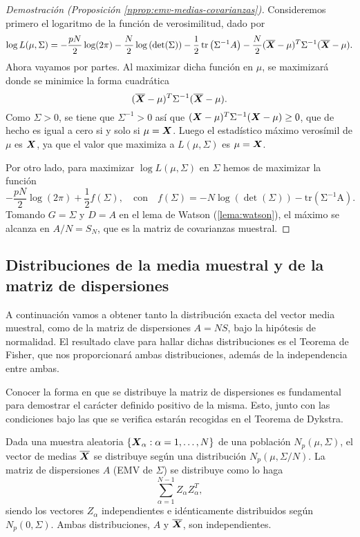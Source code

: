 \begin{proof}[Demostración (Proposición \ref{nprop:emv-medias-covarianzas})]
  Consideremos primero el logaritmo de la función de verosimilitud, dado por
  \[
    \log L(\mu,\Sigma) = -\frac{pN}{2}\log(2\pi) - \frac{N}{2}\log\left(\det(\Sigma)\right) - \frac{1}{2}\operatorname{tr}\left(\Sigma^{-1}A\right) - \frac{N}{2}(\overline{\boldsymbol{X}} - \mu)^T \Sigma^{-1}(\overline{\boldsymbol{X}} - \mu).
  \]
  Ahora vayamos por partes. Al maximizar dicha función en \(\mu\), se maximizará donde se minimice la forma cuadrática
  \[
    (\overline{\boldsymbol{X}} - \mu)^T \Sigma^{-1}(\overline{\boldsymbol{X}} - \mu).
  \]
  Como $\Sigma > 0$, se tiene que $\Sigma^{-1} > 0$ así que $(\boldsymbol{X} - \mu)^T \Sigma^{-1}(\boldsymbol{X} - \mu) \geq 0$, que de hecho es igual a cero si y solo si $\mu = \boldsymbol{X}$. 
  Luego el estadístico máximo verosímil de $\mu$ es $\boldsymbol{X}$, ya que el valor que maximiza a $L(\mu,\Sigma)$ es $\mu = \boldsymbol{X}$.

  Por otro lado, para maximizar $\log L(\mu,\Sigma)$ en $\Sigma$ hemos de maximizar la función
  \[
    -\frac{pN}{2}\log(2\pi) + \frac{1}{2}f(\Sigma), \quad \text{con} \quad f(\Sigma) = -N\log(\operatorname{det}(\Sigma)) - \operatorname{tr(\Sigma^{-1}A)}.
  \]
  Tomando \(G = \Sigma\) y \(D = A\) en el lema de Watson (\ref{lema:watson}), el máximo se alcanza en \(A/N = S_N\), que es la matriz de covarianzas muestral.
\end{proof}

\subsection{Distribuciones de la media muestral y de la matriz de dispersiones}

A continuación vamos a obtener tanto la distribución exacta del vector media muestral, como de la matriz de dispersiones \(A = NS\), bajo la hipótesis de normalidad.
El resultado clave para hallar dichas distribuciones es el Teorema de Fisher, que nos proporcionará ambas distribuciones, además de la independencia entre ambas. 

Conocer la forma en que se distribuye la matriz de dispersiones es fundamental para demostrar el carácter definido positivo de la misma. 
Esto, junto con las condiciones bajo las que se verifica estarán recogidas en el Teorema de Dykstra.

\begin{nth}
  Dada una muestra aleatoria $\{\boldsymbol{X}_\alpha: \alpha = 1,\dots,N\}$ de una población $N_p(\mu,\Sigma)$, el vector de medias $\overline{\boldsymbol{X}}$ se distribuye según una distribución $N_p\left(\mu,\Sigma/N\right)$.
  La matriz de dispersiones $A$ (EMV de $\Sigma$) se distribuye como lo haga
  \[
    \sum_{\alpha =1}^{N-1} Z_\alpha Z_\alpha^T,
  \]
  siendo los vectores $Z_\alpha$ independientes e idénticamente distribuidos según $N_p(0,\Sigma)$.
  Ambas distribuciones, $A$ y $\overline{\boldsymbol{X}}$, son independientes.
\end{nth}

